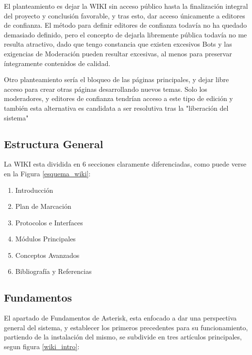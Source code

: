 El planteamiento es dejar la WIKI sin acceso público hasta la finalización integral del proyecto y conclusión favorable, y tras esto, dar acceso únicamente a editores de confianza. El método para definir editores de confianza todavía no ha quedado demasiado definido, pero el concepto de dejarla libremente pública todavía no me resulta atractivo, dado que tengo constancia que existen excesivos Bots y las exigencias de Moderación pueden resultar excesivas, al menos para preservar íntegramente contenidos de calidad.

Otro planteamiento sería el bloqueo de las páginas principales, y dejar libre acceso para crear otras páginas desarrollando nuevos temas. Solo los moderadores, y editores de confianza tendrían acceso a este tipo de edición y también esta alternativa es candidata a ser resolutiva tras la "liberación del sistema"

\subsection{Estructura General}

La WIKI esta dividida en 6 secciones claramente diferenciadas, como puede verse en la Figura \ref{esquema_wiki}:

\begin{enumerate}
	\item Introducción
	\item Plan de Marcación
	\item Protocolos e Interfaces
	\item Módulos Principales
	\item Conceptos Avanzados
	\item Bibliografía y Referencias
\end{enumerate}


\subsection{Fundamentos}

El apartado de Fundamentos de Asterisk, esta enfocado a dar una perspectiva general del sistema, y establecer los primeros precedentes para su funcionamiento, partiendo de la instalación del mismo, se subdivide en tres artículos principales, segun figura \ref{wiki_intro}:

